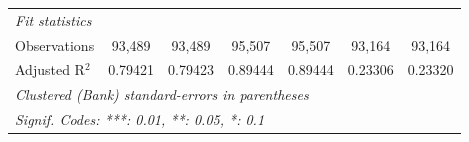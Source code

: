 \begin{tabular}{lcccccc}
   \midrule
   \emph{Fit statistics}\\
   Observations                 & 93,489         & 93,489         & 95,507         & 95,507         & 93,164          & 93,164\\  
   Adjusted R$^2$               & 0.79421        & 0.79423        & 0.89444        & 0.89444        & 0.23306         & 0.23320\\  
   \midrule \midrule
   \multicolumn{7}{l}{\emph{Clustered (Bank) standard-errors in parentheses}}\\
   \multicolumn{7}{l}{\emph{Signif. Codes: ***: 0.01, **: 0.05, *: 0.1}}\\
\end{tabular}
\par\endgroup


